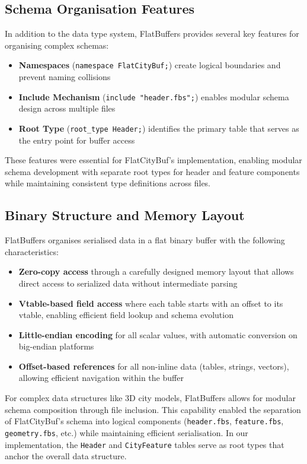 \subsection{Schema Organisation Features}
\label{tb:flatbuffers:schema_organisation}

In addition to the data type system, FlatBuffers provides several key features for organising complex schemas:

\begin{itemize}
  \item \textbf{Namespaces} (\texttt{namespace FlatCityBuf;}) create logical boundaries and prevent naming collisions

  \item \textbf{Include Mechanism} (\texttt{include "header.fbs";}) enables modular schema design across multiple files

  \item \textbf{Root Type} (\texttt{root\_type Header;}) identifies the primary table that serves as the entry point for buffer access
\end{itemize}

These features were essential for FlatCityBuf's implementation, enabling modular schema development with separate root types for header and feature components while maintaining consistent type definitions across files.

\subsection{Binary Structure and Memory Layout}
\label{tb:flatbuffers:binary_structure}

FlatBuffers organises serialised data in a flat binary buffer with the following characteristics:

\begin{itemize}
  \item \textbf{Zero-copy access} through a carefully designed memory layout that allows direct access to serialized data without intermediate parsing
  \item \textbf{Vtable-based field access} where each table starts with an offset to its vtable, enabling efficient field lookup and schema evolution
  \item \textbf{Little-endian encoding} for all scalar values, with automatic conversion on big-endian platforms
  \item \textbf{Offset-based references} for all non-inline data (tables, strings, vectors), allowing efficient navigation within the buffer
\end{itemize}


For complex data structures like 3D city models, FlatBuffers allows for modular schema composition through file inclusion. This capability enabled the separation of FlatCityBuf's schema into logical components (\texttt{header.fbs}, \texttt{feature.fbs}, \texttt{geometry.fbs}, etc.) while maintaining efficient serialisation. In our implementation, the \texttt{Header} and \texttt{CityFeature} tables serve as root types that anchor the overall data structure.
